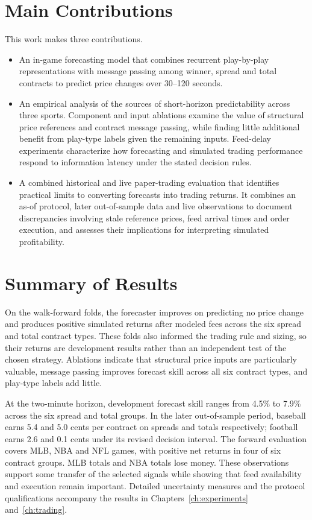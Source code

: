 \documentclass[12pt,a4paper,oneside]{report}
\begin{document}
\section{Main Contributions}
This work makes three contributions.
\begin{itemize}
  \item An in-game forecasting model that combines recurrent play-by-play
        representations with message passing among winner, spread and total
        contracts to predict price changes over 30--120 seconds.
  \item An empirical analysis of the sources of short-horizon predictability
        across three sports. Component and input ablations examine the value of
        structural price references and contract message passing, while finding
        little additional benefit from play-type labels given the remaining
        inputs. Feed-delay experiments characterize how forecasting and simulated
        trading performance respond to information latency under the stated
        decision rules.
  \item A combined historical and live paper-trading evaluation that identifies
        practical limits to converting forecasts into trading returns. It combines
        an as-of protocol, later out-of-sample data and live observations to document
        discrepancies involving stale reference prices, feed arrival times and
        order execution, and assesses their implications for interpreting
        simulated profitability.
\end{itemize}

\section{Summary of Results}
On the walk-forward folds, the forecaster improves on predicting no price change
and produces positive simulated returns after modeled fees across the six spread
and total contract types. These folds also informed the trading rule and sizing,
so their returns are development results rather than an independent test of the
chosen strategy. Ablations indicate that structural price inputs are particularly
valuable, message passing improves forecast skill across all six contract types,
and play-type labels add little.

At the two-minute horizon, development forecast skill ranges from 4.5\% to
7.9\% across the six spread and total groups. In the later out-of-sample period,
baseball earns 5.4 and 5.0 cents per contract on spreads and totals respectively;
football earns 2.6 and 0.1 cents under its revised decision interval. The
forward evaluation covers \resmainMLBAllgames{} MLB, \resmainNBAAllgames{} NBA
and \resmainNFLAllgames{} NFL games, with positive net returns in four of six
contract groups. MLB totals and NBA totals lose money. These observations
support some transfer of the selected signals while showing that feed
availability and execution remain important. Detailed uncertainty measures and the
protocol qualifications accompany the results in
Chapters~\ref{ch:experiments} and~\ref{ch:trading}.
\end{document}
